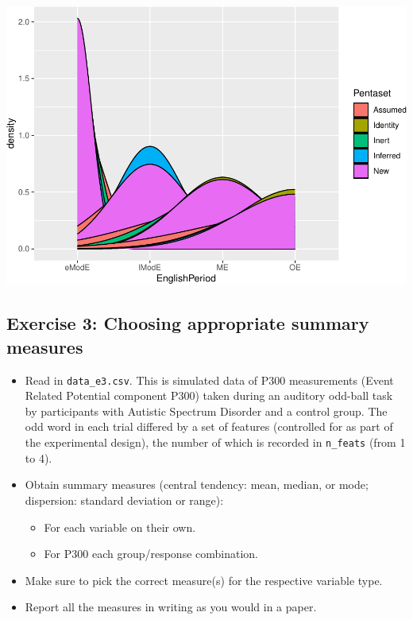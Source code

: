 \documentclass[
]{article}
\providecommand{\tightlist}{%
  \setlength{\itemsep}{0pt}\setlength{\parskip}{0pt}}
\begin{document}
\includegraphics{analysis_files/figure-latex/e2-2-1.pdf}

\newpage

\subsection{Exercise 3: Choosing appropriate summary
measures}\label{exercise-3-choosing-appropriate-summary-measures}

\begin{itemize}
\tightlist
\item
  Read in \texttt{data\_e3.csv}. This is simulated data of P300
  measurements (Event Related Potential component P300) taken during an
  auditory odd-ball task by participants with Autistic Spectrum Disorder
  and a control group. The odd word in each trial differed by a set of
  features (controlled for as part of the experimental design), the
  number of which is recorded in \texttt{n\_feats} (from 1 to 4).
\item
  Obtain summary measures (central tendency: mean, median, or mode;
  dispersion: standard deviation or range):

  \begin{itemize}
  \tightlist
  \item
    For each variable on their own.
  \item
    For P300 each group/response combination.
  \end{itemize}
\item
  Make sure to pick the correct measure(s) for the respective variable
  type.
\item
  Report all the measures in writing as you would in a paper.
\end{itemize}
\end{document}

